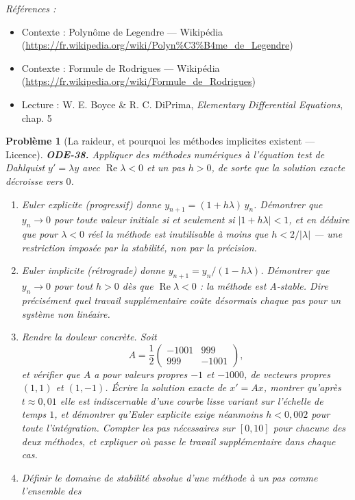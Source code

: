 \documentclass[11pt]{article}
\newtheorem{problem}{Problème}
\newenvironment{refs}{\par\small\noindent\emph{Références :}\begin{itemize}\setlength\itemsep{0pt}}{\end{itemize}\normalsize}
\begin{document}
\begin{refs}
\item Contexte : Polynôme de Legendre --- Wikipédia (\url{https://fr.wikipedia.org/wiki/Polyn%C3%B4me_de_Legendre})
\item Contexte : Formule de Rodrigues --- Wikipédia (\url{https://fr.wikipedia.org/wiki/Formule_de_Rodrigues})
\item Lecture : W. E. Boyce \& R. C. DiPrima, \textit{Elementary Differential Equations}, chap. 5
\end{refs}

\bigskip

\begin{problem}[{La raideur, et pourquoi les méthodes implicites existent --- Licence}]
\textbf{ODE-38.} Appliquer des méthodes numériques à l'équation test de Dahlquist
$ y' = \lambda y $ avec $ \operatorname{Re}\lambda < 0 $ et un pas $ h > 0 $, de sorte
que la solution exacte décroisse vers $ 0 $.
\begin{enumerate}
\item[(a)] Euler explicite (progressif) donne $ y_{n+1} = (1 + h\lambda)\,y_n $. Démontrer que
$ y_n \to 0 $ pour toute valeur initiale si et seulement si $ |1 + h\lambda| < 1 $, et en
déduire que pour $ \lambda < 0 $ réel la méthode est inutilisable à moins que
$ h < 2/|\lambda| $ --- une restriction imposée par la \textit{stabilité}, non par la
précision.
\item[(b)] Euler implicite (rétrograde) donne $ y_{n+1} = y_n/(1 - h\lambda) $. Démontrer que
$ y_n \to 0 $ pour tout $ h > 0 $ dès que $ \operatorname{Re}\lambda < 0 $ : la
méthode est \textit{A-stable}. Dire précisément quel travail supplémentaire coûte désormais chaque
pas pour un système non linéaire.
\item[(c)] Rendre la douleur concrète. Soit
\[ A = \frac{1}{2}\begin{pmatrix} -1001 & 999 \\ 999 & -1001 \end{pmatrix}, \]
et vérifier que $ A $ a pour valeurs propres $ -1 $ et $ -1000 $, de vecteurs propres
$ (1,1) $ et $ (1,-1) $. Écrire la solution exacte de $ x' = Ax $, montrer qu'après
$ t \approx 0{,}01 $ elle est indiscernable d'une courbe lisse variant sur l'échelle de temps
$ 1 $, et démontrer qu'Euler explicite exige néanmoins $ h < 0{,}002 $ pour toute
l'intégration. Compter les pas nécessaires sur $ [0, 10] $ pour chacune des deux méthodes, et
expliquer où passe le travail supplémentaire dans chaque cas.
\item[(d)] Définir le domaine de stabilité absolue d'une méthode à un pas comme l'ensemble des

\end{enumerate}
\end{problem}
\end{document}
